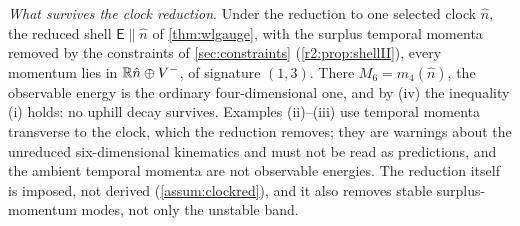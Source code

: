 \emph{What survives the clock reduction}. Under the reduction to one selected clock $\hat n$, the reduced shell $\boldsymbol{\mathsf E}\parallel\hat n$ of \cref{thm:wlgauge}, with the surplus temporal momenta removed by the constraints of \cref{sec:constraints} (\cref{r2:prop:shellII}), every momentum lies in $\mathbb{R}\hat n\oplus V^-$, of signature $(1,3)$. There $M_6=m_4(\hat n)$, the observable energy is the ordinary four-dimensional one, and by (iv) the inequality (i) holds: no uphill decay survives. Examples (ii)--(iii) use temporal momenta transverse to the clock, which the reduction removes; they are warnings about the unreduced six-dimensional kinematics and must not be read as predictions, and the ambient temporal momenta are not observable energies. The reduction itself is imposed, not derived (\cref{assum:clockred}), and it also removes stable surplus-momentum modes, not only the unstable band.

